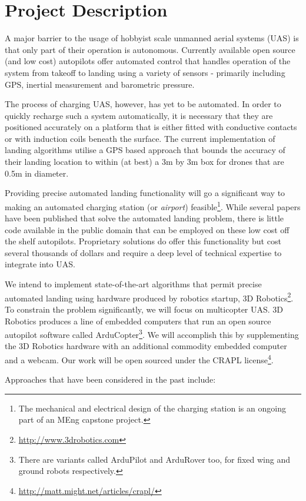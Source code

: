 \section*{Project Description}

A major barrier to the usage of hobbyist scale unmanned aerial systems (UAS) is that only part of their operation is autonomous. Currently available open source (and low cost) autopilots offer  automated control that handles operation of the system from takeoff to landing using a variety of sensors - primarily including GPS, inertial measurement and barometric pressure. 

The process of charging UAS, however, has yet to be automated. In order to quickly recharge such a system automatically, it is necessary that they are positioned accurately on a platform that is either fitted with conductive contacts or with induction coils beneath the surface. The current implementation of landing algorithms utilise a GPS based approach that bounds the accuracy of their landing location to within (at best) a 3m by 3m box for drones that are 0.5m in diameter. 

Providing precise automated landing functionality will go a significant way to making an automated charging station (or \textit{airport}) feasible\footnote{The mechanical and electrical design of the charging station is an ongoing part of an MEng capstone project.}. While several papers have been published that solve the automated landing problem, there is little code available in the public domain that can be employed on these low cost off the shelf autopilots. Proprietary solutions do offer this functionality but cost several thousands of dollars and require a deep level of technical expertise to integrate into UAS.

We intend to implement state-of-the-art algorithms that permit precise automated landing using hardware produced by robotics startup, 3D Robotics\footnote{\url{http://www.3drobotics.com}}. To constrain the problem significantly, we will focus on multicopter UAS. 3D Robotics produces a line of embedded computers that run an open source autopilot software called ArduCopter\footnote{There are variants called ArduPilot and ArduRover too, for fixed wing and ground robots respectively.}. We will accomplish this by supplementing the 3D Robotics hardware with an additional commodity embedded computer and a webcam. Our work will be open sourced under the CRAPL license\footnote{\url{http://matt.might.net/articles/crapl/}}.

Approaches that have been considered in the past include:

